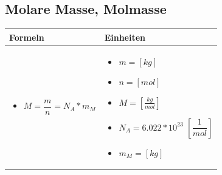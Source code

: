\subsection{Molare Masse, Molmasse}				%
\begin{table}[h!]
	\begin{tabular}{ | m{9cm} | m{9cm}  | }
		\hline
		Formeln & Einheiten \\ \hline
		\midrule
		\begin{itemize}
			\item $M=\dfrac{m}{n}=N_{A}*m_M$
			
			
		\end{itemize}
		&
		\begin{itemize}
			\item $m=[kg]$
			\item $n=[mol]$
			\item $M=[\frac{kg}{mol}]$
			\item $N_{A}=6.022*10^{23}$ $[\dfrac{1}{mol}] $
			\item $m_M=[kg]$
			
		\end{itemize}
		\\ \hline
	\end{tabular}
\end{table}

